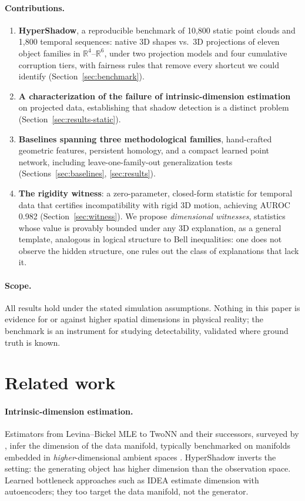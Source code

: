 \documentclass{article}
\begin{document}
\paragraph{Contributions.}
\begin{enumerate}
  \item \textbf{HyperShadow}, a reproducible benchmark of 10{,}800 static point clouds and 1{,}800 temporal sequences: native 3D shapes vs.\ 3D projections of eleven object families in $\mathbb{R}^4$--$\mathbb{R}^6$, under two projection models and four cumulative corruption tiers, with fairness rules that remove every shortcut we could identify (Section~\ref{sec:benchmark}).
  \item \textbf{A characterization of the failure of intrinsic-dimension estimation} on projected data, establishing that shadow detection is a distinct problem (Section~\ref{sec:results-static}).
  \item \textbf{Baselines spanning three methodological families}, hand-crafted geometric features, persistent homology, and a compact learned point network, including leave-one-family-out generalization tests (Sections~\ref{sec:baselines}, \ref{sec:results}).
  \item \textbf{The rigidity witness}: a zero-parameter, closed-form statistic for temporal data that certifies incompatibility with rigid 3D motion, achieving AUROC 0.982 (Section~\ref{sec:witness}). We propose \emph{dimensional witnesses}, statistics whose value is provably bounded under any 3D explanation, as a general template, analogous in logical structure to Bell inequalities: one does not observe the hidden structure, one rules out the class of explanations that lack it.
\end{enumerate}

\paragraph{Scope.} All results hold under the stated simulation assumptions. Nothing in this paper is evidence for or against higher spatial dimensions in physical reality; the benchmark is an instrument for studying detectability, validated where ground truth is known.

\section{Related work}

\paragraph{Intrinsic-dimension estimation.} Estimators from Levina--Bickel MLE \citep{levina2005mle} to TwoNN \citep{facco2017twonn} and their successors, surveyed by \citet{lee2025survey}, infer the dimension of the data manifold, typically benchmarked on manifolds embedded in \emph{higher}-dimensional ambient spaces \citep{bac2021scikit}. HyperShadow inverts the setting: the generating object has higher dimension than the observation space. Learned bottleneck approaches such as IDEA \citep{idea2025} estimate dimension with autoencoders; they too target the data manifold, not the generator.
\end{document}
